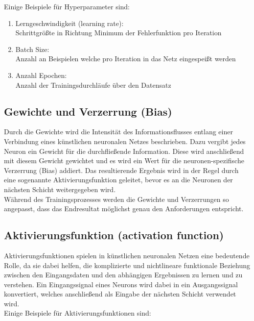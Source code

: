 Einige Beispiele für Hyperparameter sind:

\begin{enumerate}
	\item Lerngeschwindigkeit (learning rate):\\
	Schrittgrößte in Richtung Minimum der Fehlerfunktion pro Iteration 
	\item Batch Size:\\
	Anzahl an Beispielen welche pro Iteration in das Netz eingespeißt werden
	\item Anzahl Epochen:\\
	Anzahl der Trainingsdurchläufe über den Datensatz
\end{enumerate}
	
\subsection{Gewichte und Verzerrung (Bias)}

	Durch die Gewichte wird die Intensität des Informationsflusses entlang einer Verbindung eines künstlichen neuronalen Netzes beschrieben. Dazu vergibt jedes Neuron ein Gewicht für die durchfließende Information. Diese wird anschließend mit diesem Gewicht gewichtet und es wird ein Wert für die neuronen-spezifische Verzerrung (Bias) addiert. Das resultierende Ergebnis wird in der Regel durch eine sogenannte Aktivierungsfunktion geleitet, bevor es an die Neuronen der nächsten Schicht weitergegeben wird. \cite{jaai} \\
	
	Während des Trainingsprozesses werden die Gewichte und Verzerrungen so angepasst, dass das Endresultat möglichst genau den Anforderungen entspricht. \cite{jaai}
	
\subsection{Aktivierungsfunktion (activation function)}

	Aktivierungsfunktionen spielen in künstlichen neuronalen Netzen eine bedeutende Rolle, da sie dabei helfen, die komplizierte und nichtlineare funktionale Beziehung zwischen den Eingangsdaten und den abhängigen Ergebnissen zu lernen und zu verstehen. Ein Eingangssignal eines Neurons wird dabei in ein Ausgangssignal konvertiert, welches anschließend als Eingabe der nächsten Schicht verwendet wird. \cite{ai-united} \\
	
	Einige Beispiele für Aktivierungsfunktionen sind:
	
